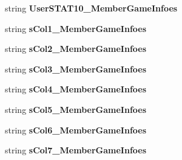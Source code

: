 \begin{DoxyCompactItemize}
\item 
string {\bfseries User\+S\+T\+A\+T10\+\_\+\+Member\+Game\+Infoes}\hypertarget{a00111_a908c8c72426bc6f0a0db9925f84af065}{}\label{a00111_a908c8c72426bc6f0a0db9925f84af065}

\item 
string {\bfseries s\+Col1\+\_\+\+Member\+Game\+Infoes}\hypertarget{a00111_aef1a95639ac27851d040a6738b32e275}{}\label{a00111_aef1a95639ac27851d040a6738b32e275}

\item 
string {\bfseries s\+Col2\+\_\+\+Member\+Game\+Infoes}\hypertarget{a00111_aac57d71d27e85216a0a8ef15f54b3fc1}{}\label{a00111_aac57d71d27e85216a0a8ef15f54b3fc1}

\item 
string {\bfseries s\+Col3\+\_\+\+Member\+Game\+Infoes}\hypertarget{a00111_a4b8845219c02f70c4c993836e23d7de2}{}\label{a00111_a4b8845219c02f70c4c993836e23d7de2}

\item 
string {\bfseries s\+Col4\+\_\+\+Member\+Game\+Infoes}\hypertarget{a00111_af5407ee268096061067177758345e2f9}{}\label{a00111_af5407ee268096061067177758345e2f9}

\item 
string {\bfseries s\+Col5\+\_\+\+Member\+Game\+Infoes}\hypertarget{a00111_a182d3fe840c360d402eb4108831eb963}{}\label{a00111_a182d3fe840c360d402eb4108831eb963}

\item 
string {\bfseries s\+Col6\+\_\+\+Member\+Game\+Infoes}\hypertarget{a00111_a259e023421c19e5c52977e2bfee14995}{}\label{a00111_a259e023421c19e5c52977e2bfee14995}

\item 
string {\bfseries s\+Col7\+\_\+\+Member\+Game\+Infoes}\hypertarget{a00111_a2ce362f528acd1f9dc29d702eaa435cc}{}\label{a00111_a2ce362f528acd1f9dc29d702eaa435cc}


\end{DoxyCompactItemize}
